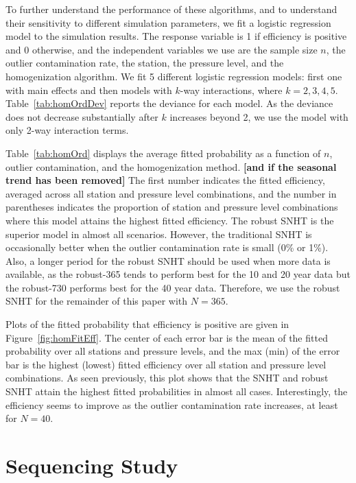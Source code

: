 \documentclass[12pt]{article}
\begin{document}
\begin{doublespacing}
To further understand the performance of these algorithms, and to understand their sensitivity to different simulation parameters, we fit a logistic regression model to the simulation results.  The response variable is 1 if efficiency is positive and 0 otherwise, and the independent variables we use are the sample size $n$, the outlier contamination rate, the station, the pressure level, and the homogenization algorithm.  We fit 5 different logistic regression models: first one with main effects and then models with $k$-way interactions, where $k=2,3,4,5$.  Table~\ref{tab:homOrdDev} reports the deviance for each model.  As the deviance does not decrease substantially after $k$ increases beyond 2, we use the model with only 2-way interaction terms.

Table~\ref{tab:homOrd} displays the average fitted probability as a function of $n$, outlier contamination, and the homogenization method.  \textbf{[and if the seasonal trend has been removed]}  The first number indicates the fitted efficiency, averaged across all station and pressure level combinations, and the number in parentheses indicates the proportion of station and pressure level combinations where this model attains the highest fitted efficiency.  The robust SNHT is the superior model in almost all scenarios.  However, the traditional SNHT is occasionally better when the outlier contamination rate is small (0\% or 1\%).  Also, a longer period for the robust SNHT should be used when more data is available, as the robust-365 tends to perform best for the 10 and 20 year data but the robust-730 performs best for the 40 year data.  Therefore, we use the robust SNHT for the remainder of this paper with $N=365$.

Plots of the fitted probability that efficiency is positive are given in Figure~\ref{fig:homFitEff}.  The center of each error bar is the mean of the fitted probability over all stations and pressure levels, and the max (min) of the error bar is the highest (lowest) fitted efficiency over all station and pressure level combinations.  As seen previously, this plot shows that the SNHT and robust SNHT attain the highest fitted probabilities in almost all cases.  Interestingly, the efficiency seems to improve as the outlier contamination rate increases, at least for $N=40$.

\section{Sequencing Study}


\end{doublespacing}
\end{document}
